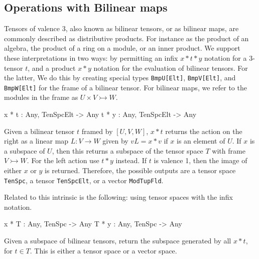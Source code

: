 \subsection{Operations with Bilinear maps}
Tensors of valence $3$, also known as bilinear tensors, or
as bilinear maps,  are commonly described as distributive products.
For instance as the product of an algebra, the product of a ring on 
a module, or an inner product.  We support these interpretations in two ways:
by permitting an infix $x*t*y$ notation for a 3-tensor $t$, and a product $x*y$ notation for the evaluation of bilinear
tensors.  For the latter, We do this by creating special types 
\texttt{BmpU[Elt]}, \texttt{BmpV[Elt]}, and \texttt{BmpW[Elt]} for the frame
of a bilinear tensor.
For bilinear maps, we refer to the modules in the frame as $U\times V\rightarrowtail W$. 

\begin{intrinsics}
x * t : Any, TenSpcElt -> Any
t * y : Any, TenSpcElt -> Any
\end{intrinsics}

Given a bilinear tensor $t$ framed by $[U, V, W]$, $x*t$ returns the action on the right as a linear map $L : V\rightarrow W$ given by $vL = x* v$ if $x$ is an element of $U$. 
If $x$ is a subspace of $U$, then this returns a subspace of the tensor space $T$ with frame $V\rightarrowtail W$.
For the left action use $t*y$ instead.
If $t$ is valence 1, then the image of either $x$ or $y$ is returned.
Therefore, the possible outputs are a tensor space \texttt{TenSpc}, a tensor \texttt{TenSpcElt}, or a vector \texttt{ModTupFld}. 

Related to this intrinsic is the following: using tensor spaces with the infix notation.

\begin{intrinsics}
x * T : Any, TenSpc -> Any
T * y : Any, TenSpc -> Any
\end{intrinsics}

Given a subspace of bilinear tensors, return the subspace generated by all $x*t$, for $t\in T$. 
This is either a tensor space or a vector space. 

